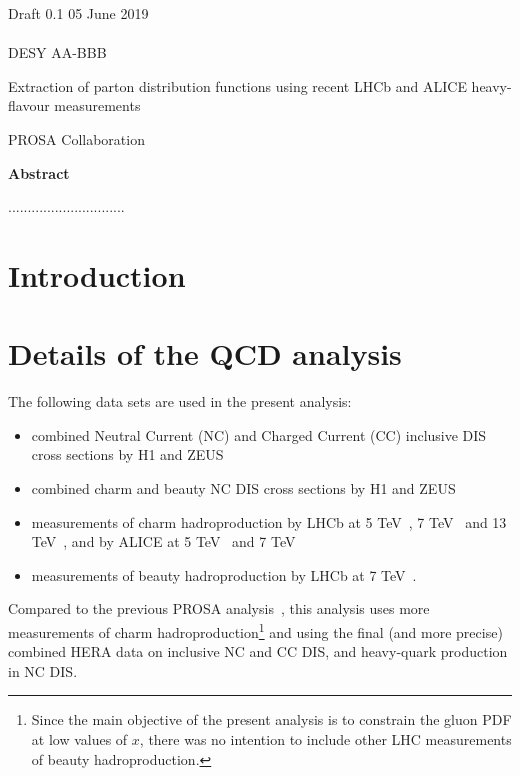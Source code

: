 \documentclass[12pt]{article}
\begin{document}
\begin{titlepage}
\noindent
Draft 0.1  \hfill 05 June 2019\\
\\
DESY AA-BBB %
\\

\vspace{1.3cm}

\begin{center}
  {\bf 

\large

Extraction of parton distribution functions using recent LHCb and ALICE heavy-flavour measurements
  }
  \vspace{1.5cm}

  {\large
    PROSA Collaboration
  }\\

  \vspace{1.2cm}

\end{center}
  \vspace{2.4cm}
\begin{center}
\large
{\bf Abstract}
\vspace{-0.2cm}
\end{center}
..............................
\vfill
\end{titlepage}


%
%
\newpage

\section{Introduction}
\label{sect:intro}

\section{Details of the QCD analysis}
\label{sec:th}

The following data sets are used in the present analysis:
\begin{itemize}
    \item combined Neutral Current (NC) and Charged Current (CC) inclusive DIS cross sections by H1 and ZEUS~\cite{}
    \item combined charm and beauty NC DIS cross sections by H1 and ZEUS~\cite{}
    \item measurements of charm hadroproduction by LHCb at 5 TeV~\cite{}, 7 TeV~\cite{} and 13 TeV~\cite{}, and by ALICE at 5 TeV~\cite{} and 7 TeV~\cite{}
    \item measurements of beauty hadroproduction by LHCb at 7 TeV~\cite{}.
\end{itemize}
Compared to the previous PROSA analysis~\cite{}, this analysis uses more measurements of charm hadroproduction\footnote{Since the main objective of the present analysis is to constrain the gluon PDF at low values of $x$, there was no intention to include other LHC measurements of beauty hadroproduction.}
and using the final (and more precise) combined HERA data on inclusive NC and CC DIS, and heavy-quark production in NC DIS.
\end{document}

